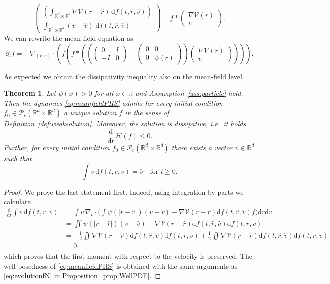 \documentclass[11pt]{article}
\newtheorem{theorem}{Theorem}[section]
\newcommand{\R}[0]{\mathbb R}
\newcommand{\calH}[0]{\mathcal H}
\newcommand{\calP}[0]{\mathcal P}
\newcommand{\calV}[0]{\mathcal V}
\newcommand{\dd}[0]{\mathrm d}
\newcommand{\V}[0]{\mathcal V}
\begin{document}
\begin{bibunit}[abbrv]
\begin{equation}
\begin{pmatrix}
\left(\int_{\R^d \times \R^d} \nabla \V(r-\hat r) \, \dd f(t,\hat r,\hat v)\right)  \\ \int_{\R^d \times \R^d} (v-\hat v) \; \dd f(t,\hat r,\hat v) \end{pmatrix} = f\ast \begin{pmatrix} \nabla \V(r) \\ v \end{pmatrix}.
\end{equation}
We can rewrite the mean-field equation as
\begin{equation}\label{eq:meanfieldPHS}
 \partial_t f = -\nabla_{(r,v)} \cdot \left(f \left( f \ast \left(\left(\begin{pmatrix} 0 & I \\ -I & 0 \end{pmatrix} -\begin{pmatrix} 0 & 0 \\ 0 & \psi(r) \end{pmatrix}\right) \begin{pmatrix} \nabla \V(r) \\ v \end{pmatrix} \right) \right) \right).
\end{equation}

As expected we obtain the dissipativity inequality also on the mean-field level.
\begin{theorem}\label{thm:dissipativityF}
Let $\psi(x) > 0$ for all $x\in \R$ and  Assumption~\ref{ass:particle} hold. Then the dynamics \eqref{eq:meanfieldPHS} admits for every initial condition $f_0\in \calP_c(\R^d \times \R^d)$ a unique solution $f$ in the sense of Definition~\ref{def:weaksolution}. Moreover, the solution is dissipative, i.e.~it holds
\[
\frac{\dd}{\dd t} \calH(f) \le 0.
\]
Further, for every initial condition $f_0 \in \calP_c(\R^d \times \R^d)$ there exists a vector $\bar v \in \R^d$ such that 
\[
\int v\, \dd f(t,r,v) = \bar v \quad \text{for }t\ge 0.
\]
\end{theorem}
\begin{proof} 

We prove the last statement first. Indeed, using integration by parts we calculate 
\begin{align*}
\frac{\dd}{\dd t} \int v\, \dd f (t,r,v) %
&= \int v \, \nabla_v \cdot \Big( \int \psi(| r -  \hat r |)(v - \hat v) - \nabla \V(r - \hat r) \dd f(t,\hat r,\hat v) f \Big) \dd r \dd v \\
&= \iint \psi(|r - \hat r|) (v - \hat v) - \nabla \calV(r-\hat r) \dd f(t,\hat r, \hat v) \dd f(t,r,v) \\
&= -\frac{1}{2} \iint \nabla \calV(r-\hat r) \dd f(t,\hat r, \hat v) \dd f(t,r,v) + \frac{1}{2} \iint \nabla \calV(r- \hat r) \dd f(t,\hat r, \hat v) \dd f(t,r,v) \\
&= 0,
\end{align*}
which proves that the first moment with respect to the velocity is preserved. The well-posedness of \eqref{eq:meanfieldPHS} is obtained  with the same arguments as \eqref{eq:evolutionfN} in Proposition~\ref{prop:WellPDE}. 


\end{proof}
\end{bibunit}
\end{document}
